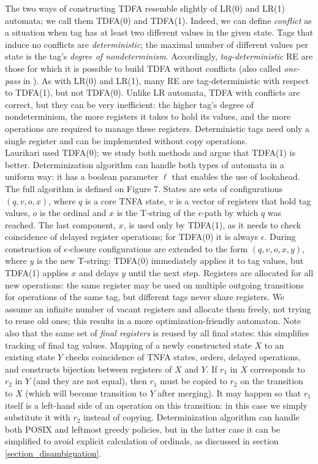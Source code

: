 \documentclass{article}
\theoremstyle{definition}
\begin{document}
\begin{multicols}{2}
The two ways of constructing TDFA resemble slightly of LR(0) and LR(1) automata; we call them TDFA(0) and TDFA(1).
Indeed, we can define \emph{conflict} as a situation when tag has at least two different values in the given state.
Tags that induce no conflicts are \emph{deterministic};
the maximal number of different values per state is the tag's \emph{degree of nondeterminism}.
Accordingly, \emph{tag-deterministic} RE are those for which it is possible to build TDFA without conflicts
(also called \emph{one-pass} in \cite{Cox10}).
As with LR(0) and LR(1), many RE are tag-deterministic with respect to TDFA(1), but not TDFA(0).
Unlike LR automata, TDFA with conflicts are correct, but they can be very inefficient:
the higher tag's degree of nondeterminism, the more registers it takes to hold its values,
and the more operations are required to manage these registers.
Deterministic tags need only a single register and can be implemented without copy operations.
\\

Laurikari used TDFA(0); we study both methods and argue that TDFA(1) is better.
Determinization algorithm can handle both types of automata in a uniform way:
it has a boolean parameter $\ell$ that enables the use of lookahead.
The full algorithm is defined on Figure 7.
States are sets of configurations $(q, v, o, x)$,
where $q$ is a core TNFA state, $v$ is a vector of registers that hold tag values, $o$ is the ordinal
and $x$ is the T-string of the $\epsilon$-path by which $q$ was reached.
The last component, $x$, is used only by TDFA(1), as it needs to check coincidence of delayed register operations;
for TDFA(0) it is always $\epsilon$.
During construction of $\epsilon$-closure configurations are extended to the form $(q, v, o, x, y)$,
where $y$ is the new T-string: TDFA(0) immediately applies it to tag values,
but TDFA(1) applies $x$ and delays $y$ until the next step.
Registers are allocated for all new operations:
the same register may be used on multiple outgoing transitions for operations of the same tag,
but different tags never share registers.
We assume an infinite number of vacant registers and allocate them freely, not trying to reuse old ones;
this results in a more optimization-friendly automaton.
Note also that the same set of \emph{final registers} is reused by all final states:
this simplifies tracking of final tag values.
Mapping of a newly constructed state $X$ to an existing state $Y$ checks coincidence of TNFA states, orders, delayed operations,
and constructs bijection between registers of $X$ and $Y$.
If $r_1$ in $X$ corresponds to $r_2$ in $Y$ (and they are not equal), then $r_1$ must be copied to $r_2$ on the transition to $X$
(which will become transition to $Y$ after merging).
It may happen so that $r_1$ itself is a left-hand side of an operation on this transition:
in this case we simply substitute it with $r_2$ instead of copying.
Determinization algorithm can handle both POSIX and leftmost greedy policies,
but in the latter case it can be simplified to avoid explicit calculation of ordinals, as discussed in section \ref{section_disambiguation}.


\end{multicols}
\end{document}
